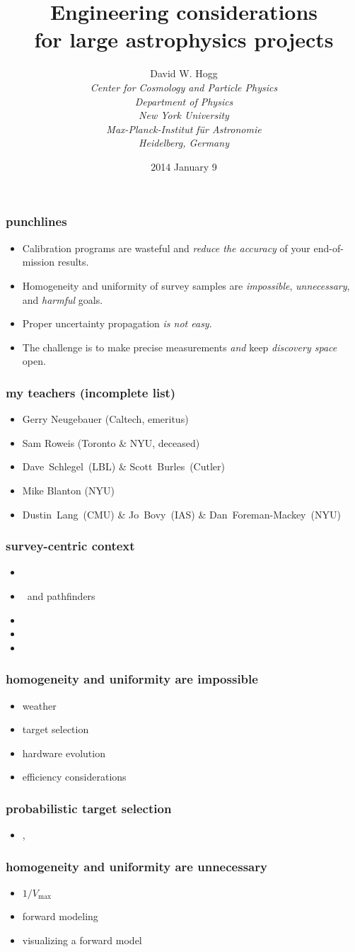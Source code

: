 \documentclass[pdftex]{beamer}
\title{Engineering considerations\\ for large astrophysics projects}
\author[David W. Hogg (NYU)]{David W. Hogg \\[1ex]
  \textsl{\small Center for Cosmology and Particle Physics\\
                 Department of Physics\\
                 New York University\\[1ex]
                 Max-Planck-Institut f\"ur Astronomie\\
                 Heidelberg, Germany}}
\date{2014 January 9}
\newcommand{\conclusionslide}{
\begin{frame}
  \frametitle{punchlines}
  \begin{itemize}
  \item Calibration programs are wasteful and \emph{reduce the accuracy} of your end-of-mission results.
  \item Homogeneity and uniformity of survey samples are \emph{impossible}, \emph{unnecessary}, and \emph{harmful} goals.
  \item Proper uncertainty propagation \emph{is not easy}.
  \item The challenge is to make precise measurements \emph{and} keep \emph{discovery space} open.
  \end{itemize}
\end{frame}
}
\begin{document}
\begin{frame}
  \titlepage
\end{frame}

\conclusionslide

\begin{frame}
  \frametitle{my teachers (incomplete list)}
  \begin{itemize}
  \item Gerry Neugebauer (Caltech, emeritus)
  \item Sam Roweis (Toronto \& NYU, deceased)
  \item Dave~Schlegel~(LBL) \& Scott~Burles~(Cutler)
  \item Mike Blanton (NYU)
  \item Dustin~Lang~(CMU) \& Jo~Bovy~(IAS) \& Dan~Foreman-Mackey~(NYU)
  \end{itemize}
\end{frame}

\begin{frame}
  \frametitle{survey-centric context}
  \begin{itemize}
  \item \gaia
  \item \ska\ and pathfinders
  \item \euclid
  \item \lsst
  \item \sdssiv
  \end{itemize}
\end{frame}

\begin{frame}
  \frametitle{homogeneity and uniformity are impossible}
  \begin{itemize}
  \item weather
  \item target selection
  \item hardware evolution
  \item efficiency considerations
  \end{itemize}
\end{frame}

\begin{frame}
  \frametitle{probabilistic target selection}
  \begin{itemize}
  \item \sdssiii, \sdssiv
  \end{itemize}
\end{frame}

\begin{frame}
  \frametitle{homogeneity and uniformity are unnecessary}
  \begin{itemize}
  \item $1 / V_{\mathrm{max}}$
  \item forward modeling
  \item visualizing a forward model
  \end{itemize}
\end{frame}
\end{document}

